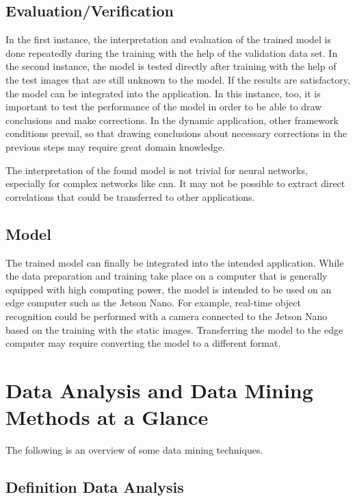 \subsection{Evaluation/Verification}

In the first instance, the interpretation and evaluation of the trained model is done repeatedly during the training with the help of the validation data set. In the second instance, the model is tested directly after training with the help of the test images that are still unknown to the model. If the results are satisfactory, the model can be integrated into the application. In this instance, too, it is important to test the performance of the model in order to be able to draw conclusions and make corrections. In the dynamic application, other framework conditions prevail, so that drawing conclusions about necessary corrections in the previous steps may require great domain knowledge.

The interpretation of the found model is not trivial for neural networks, especially for complex networks like \ac{cnn}. It may not be possible to extract direct correlations that could be transferred to other applications.


\subsection{Model}

The trained model can finally be integrated into the intended application. While the data preparation and training take place on a computer that is generally equipped with high computing power, the model is intended to be used on an edge computer such as the Jetson Nano. For example, real-time object recognition could be performed with a camera connected to the Jetson Nano based on the training with the static images. Transferring the model to the edge computer may require converting the model to a different format.


\section{Data Analysis and Data Mining Methods at a Glance}

The following is an overview of some data mining techniques.

\subsection{Definition Data Analysis}


